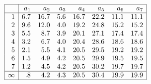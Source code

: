 \documentclass{standalone}
\begin{document}
$%
\begin{array}{|r|rrrrrrr|} \hline
& a_1 & a_2 & a_3 & a_4 & a_5 & a_6 & a_7 \\
\hline
 1 & 6.7 &16.7 & 5.6 & 16.7 & 22.2 & 11.1 & 11.1 \\
 2 & 9.6 &12.0 & 4.0 & 19.2 & 24.8 & 15.2 & 15.2 \\
 3 & 5.5 & 8.7 & 3.9 & 20.1 & 27.1 & 17.4 & 17.4 \\
 4 & 3.2 & 6.7 & 4.0 & 20.4 & 28.6 & 18.6 & 18.6 \\
 5 & 2.1 & 5.5 & 4.1 & 20.5 & 29.5 & 19.2 & 19.2 \\
 6 & 1.5 & 4.9 & 4.2 & 20.5 & 29.9 & 19.5 & 19.5 \\
 7 & 1.2 & 4.5 & 4.2 & 20.5 & 30.2 & 19.7 & 19.7 \\
\hline
\infty &  .8 & 4.2 & 4.3 & 20.5 & 30.4 & 19.9 & 19.9 \\
\hline
\end{array}
$
\end{document}

